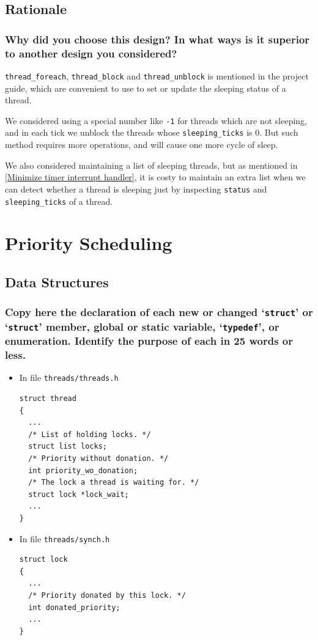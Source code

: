 \documentclass[sigconf, nonacm, balance=false, urlbreakonhyphens=true]{acmart}
\begin{document}
        \subsection{Rationale}
            
            \subsubsection{Why did you choose this design? In what ways is it superior to another design you considered? }
                \texttt{thread\_foreach}, \texttt{thread\_block} and \texttt{thread\_unblock} is mentioned in the project guide, which are convenient to use to set or update the sleeping status of a thread.

                We considered using a special number like \texttt{-1} for threads which are not sleeping, and in each tick we unblock the threads whose \texttt{sleeping\_ticks} is 0. But such method requires more operations, and will cause one more cycle of sleep. 

                We also considered maintaining a list of sleeping threads, but as mentioned in \ref{Minimize timer interrupt handler}, it is costy to maintain an extra list when we can detect whether a thread is sleeping just by inspecting \texttt{status} and \texttt{sleeping\_ticks} of a thread. 
    
    \section{Priority Scheduling}

        \label{Priority Scheduling}

        \subsection{Data Structures}
            
            \subsubsection{Copy here the declaration of each new or changed `\texttt{struct}' or `\texttt{struct}' member, global or static variable, `\texttt{typedef}', or enumeration. Identify the purpose of each in 25 words or less. } 

                \begin{itemize}
                    \item In file \texttt{threads/threads.h}
\begin{verbatim}
struct thread
{
  ...
  /* List of holding locks. */
  struct list locks; 
  /* Priority without donation. */
  int priority_wo_donation;
  /* The lock a thread is waiting for. */
  struct lock *lock_wait;             
  ...
}
\end{verbatim}
                    \item In file \texttt{threads/synch.h}
\begin{verbatim}
struct lock
{
  ...
  /* Priority donated by this lock. */   
  int donated_priority;              
  ...
}
\end{verbatim}
                \end{itemize}
\end{document}
